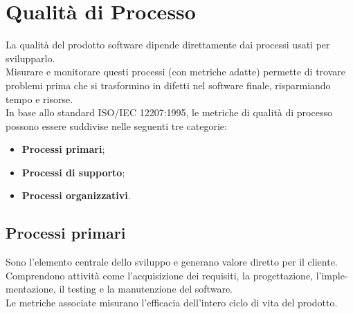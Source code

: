\section{Qualità di Processo}
La qualità del prodotto software dipende direttamente dai processi usati per svilupparlo.\\  
Misurare e monitorare questi processi (con metriche adatte) permette di trovare problemi prima che si trasformino in difetti nel software finale, risparmiando tempo e risorse.\\
In base allo standard ISO/IEC 12207:1995, le metriche di qualità di processo possono essere suddivise nelle seguenti tre categorie:
\begin{itemize}[itemsep=0pt, parsep=1pt, label=$\scriptstyle\bullet$]
        \item \textbf{Processi primari};
        \item \textbf{Processi di supporto};
        \item \textbf{Processi organizzativi}.
\end{itemize}

\subsection{Processi primari}
Sono l’elemento centrale dello sviluppo e generano valore diretto per il cliente.\\ 
Comprendono attività come l’acquisizione dei requisiti, la progettazione, l'imple-\newline mentazione, il testing e la manutenzione del software.\\
Le metriche associate misurano l’efficacia dell’intero ciclo di vita del prodotto.

